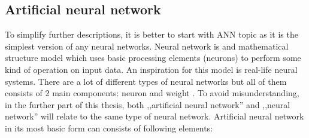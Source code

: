     \subsection{Artificial neural network}\label{sec:artificial-neural-network}
    To simplify further descriptions, it is better to start with ANN topic as it is the simplest version of any neural networks. Neural network is and mathematical structure model which uses basic processing elements (neurons) to perform some kind of operation on input data. An inspiration for this model is real-life neural systems. There are a lot of different types of neural networks but all of them consists of 2 main components: neuron and weight \cite{bib:internet-neural-network-and-deep-learning}. To avoid misunderstanding, in the further part of this thesis, both ,,artificial neural network'' and ,,neural network'' will relate to the same type of neural network. Artificial neural network in its most basic form can consists of following elements:
